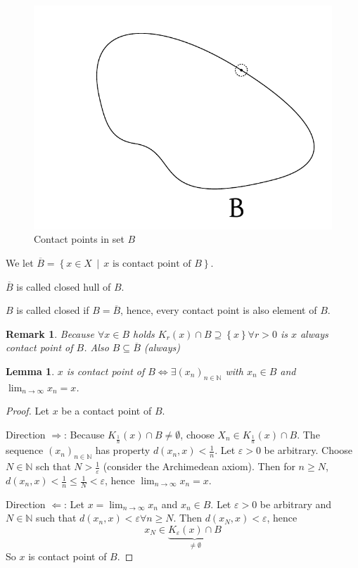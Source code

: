 \documentclass{article}
\newtheorem{lemma}{Lemma}  \numberwithin{lemma}{section}
\newtheorem{remark}{Remark}  \numberwithin{remark}{section}
\newcommand{\set}[1]{\left\{#1\right\}}
\newcommand{\setdef}[2]{\left\{\left.#1\,\middle|\,#2\right.\right\}}
\begin{document}
\begin{figure}
  \begin{center}
    \includegraphics{img/03_contact_point.pdf}
    \caption{Contact points in set $B$}
    \label{img:cp}
  \end{center}
\end{figure}

We let $\overline{B} = \setdef{x \in X}{x \text{ is contact point of } B}$.

$\overline{B}$ is called closed hull of $B$.

$B$ is called closed if $B = \overline{B}$, hence, every contact point is also element of $B$.

\begin{remark}
  Because $\forall x \in B$ holds $K_r(x) \cap B \supseteq \set{x} \forall r > 0$ is $x$ always contact point of $B$.
  Also $B \subseteq \overline{B}$ (always)
\end{remark}

\begin{lemma}
  $x$ is contact point of $B \iff \exists (x_n)_{n\in\mathbb N}$ with $x_n \in B$ and $\lim_{n\to\infty} x_n = x$.
\end{lemma}
\begin{proof}
  Let $x$ be a contact point of $B$.

  Direction $\Rightarrow$:
  Because $K_{\frac1n}(x) \cap B \neq \emptyset$, choose $X_n \in K_{\frac1n}(x) \cap B$.
  The sequence $(x_n)_{n\in\mathbb N}$ has property $d(x_n, x) < \frac1n$.
  Let $\varepsilon > 0$ be arbitrary. Choose $N \in \mathbb N$ sch that $N > \frac1\varepsilon$ (consider the Archimedean axiom).
  Then for $n \geq N$, $d(x_n, x) < \frac1n \leq \frac1N < \varepsilon$, hence $\lim_{n\to\infty} x_n = x$.

  Direction $\Leftarrow$:
  Let $x = \lim_{n\to\infty} x_n$ and $x_n \in B$.
  Let $\varepsilon > 0$ be arbitrary and $N \in \mathbb N$ such that $d(x_n, x) < \varepsilon \forall n \geq N$.
  Then $d(x_N, x) < \varepsilon$, hence
  \[ x_N \in \underbrace{K_{\varepsilon}(x) \cap B}_{\neq \emptyset} \]
  So $x$ is contact point of $B$.
\end{proof}
\end{document}
